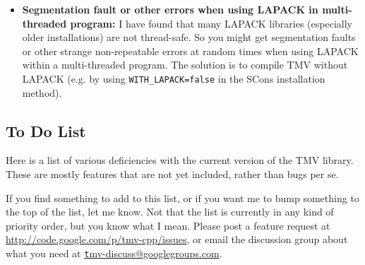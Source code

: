 \documentclass[twoside,letterpaper,11pt]{article}
\makeatletter
\newcommand{\mygroupx}{tmv-discuss@googlegroups.com}
\newcommand{\mygroup}{\href{mailto:\mygroupx}{\texttt \mygroupx}}
\newcommand{\myissuesx}{http://code.google.com/p/tmv-cpp/issues}
\newcommand{\myissues}{\url{\myissuesx}}
\renewcommand{\tt}[1]{{\lstinline {#1}}}
\makeatother
\begin{document}
\begin{itemize}
\item {\bf Segmentation fault or other errors when using LAPACK in multi-threaded program:}
I have found that many LAPACK libraries (especially older installations) 
are not thread-safe.  So you might get segmentation faults or other strange
non-repeatable errors at random times when using LAPACK within a multi-threaded
program.  The solution is to compile TMV without LAPACK (e.g. by using
\tt{WITH_LAPACK=false} in the SCons installation method).  

\end{itemize}

\subsection{To Do List}
\label{To_Do_List}

Here is a list of various deficiencies with the current version of the TMV library.
These are mostly features that are not yet included, rather than bugs per se.

If you find something to add to this list, or if you want me to bump something
to the top of the list, let me know.  Not that the list is currently in any kind of 
priority order, but you know what I mean.  Please post a feature request
at \myissues, or email the discussion group about what you need at \mygroup.
\end{document}
